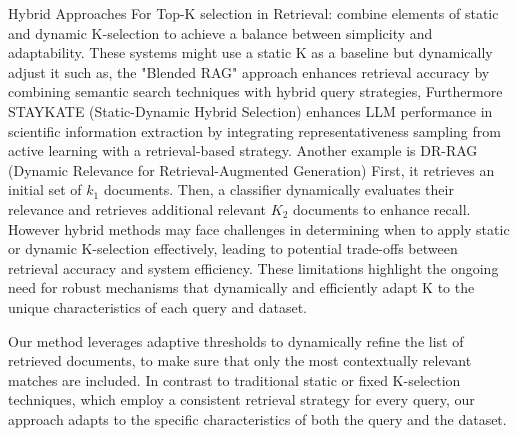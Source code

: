 \documentclass[Afour,sageh,times]{sagej}
\begin{document}
Hybrid Approaches For Top-K selection in Retrieval: combine elements of static and dynamic K-selection to achieve a balance between simplicity and adaptability. These systems might use a static K as a baseline but dynamically adjust it such as, the "Blended RAG" \cite{sawarkar2024blendedragimprovingrag} approach enhances retrieval accuracy by combining semantic search techniques with hybrid query strategies, Furthermore STAYKATE (Static-Dynamic Hybrid Selection) \cite{Zhu2024} enhances LLM performance in scientific information extraction by integrating representativeness sampling from active learning with a retrieval-based strategy. Another example is DR-RAG (Dynamic Relevance for Retrieval-Augmented Generation) \cite{hei2024drragapplyingdynamicdocument} First, it retrieves an initial set of $k_1$ documents. Then, a classifier dynamically evaluates their relevance and retrieves additional relevant $K_2$ documents to enhance recall. However hybrid methods may face challenges in determining when to apply static or dynamic K-selection effectively, leading to potential trade-offs between retrieval accuracy and system efficiency. These limitations highlight the ongoing need for robust mechanisms that dynamically and efficiently adapt K to the unique characteristics of each query and dataset.

Our method leverages adaptive thresholds to dynamically refine the list of retrieved documents, to make sure that only the most contextually relevant matches are included. In contrast to traditional static or fixed K-selection techniques, which employ a consistent retrieval strategy for every query, our approach adapts to the specific characteristics of both the query and the dataset.
\end{document}
